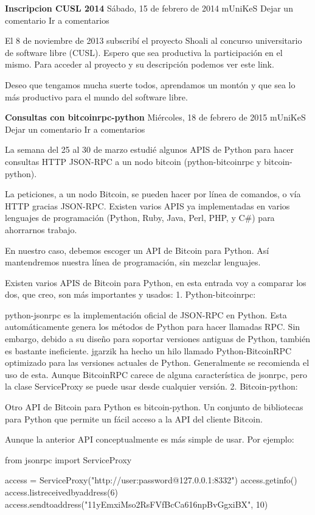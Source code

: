 \documentclass[a4paper, 12pt]{book}
\begin{document}
\textbf{Inscripcion CUSL 2014}
Sábado, 15 de febrero de 2014 mUniKeS   Dejar un comentario Ir a comentarios

El 8 de noviembre de 2013 subscribí el proyecto Shoali al concurso universitario de software libre (CUSL). Espero que sea productiva la participación en el mismo. Para acceder al proyecto y su descripción podemos ver este link.

Deseo que tengamos mucha suerte todos, aprendamos un montón y que sea lo más productivo para el mundo del software libre.

\textbf{Consultas con bitcoinrpc-python}
Miércoles, 18 de febrero de 2015 mUniKeS        Dejar un comentario Ir a comentarios

La semana del 25 al 30 de marzo estudié algunos APIS de Python para hacer consultas HTTP JSON-RPC a un nodo bitcoin (python-bitcoinrpc y bitcoin-python).

La peticiones, a un nodo Bitcoin, se pueden hacer por línea de comandos, o vía HTTP gracias JSON-RPC. Existen varios APIS ya implementadas en varios lenguajes de programación (Python, Ruby, Java, Perl, PHP, y C#) para ahorrarnos trabajo.

En nuestro caso, debemos escoger un API de Bitcoin para Python. Así mantendremos nuestra línea de programación, sin mezclar lenguajes.

Existen varios APIS de Bitcoin para Python, en esta entrada voy a comparar los dos, que creo, son más importantes y usados:
1. Python-bitcoinrpc:

python-jsonrpc es la implementación oficial de JSON-RPC en Python. Esta automáticamente genera los métodos de Python para hacer llamadas RPC. Sin embargo, debido a su diseño para soportar versiones antiguas de Python, también es bastante ineficiente. jgarzik ha hecho un hilo llamado Python-BitcoinRPC optimizado para las versiones actuales de Python. Generalmente se recomienda el uso de esta. Aunque BitcoinRPC carece de alguna característica de jsonrpc, pero la clase ServiceProxy se puede usar desde cualquier versión.
2. Bitcoin-python:

Otro API de Bitcoin para Python es bitcoin-python. Un conjunto de bibliotecas para Python que permite un fácil acceso a la API del cliente Bitcoin.

Aunque la anterior API conceptualmente es más simple de usar. Por ejemplo:

from jsonrpc import ServiceProxy
 
access = ServiceProxy("http://user:password@127.0.0.1:8332")
access.getinfo()
access.listreceivedbyaddress(6)
access.sendtoaddress("11yEmxiMso2RsFVfBcCa616npBvGgxiBX", 10)
\end{document}
